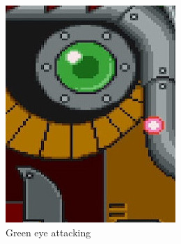 \begin{figure}[htp]
\begin{figure}[htp]
	\centering
	\begin{subfigure}[t]{0.30\linewidth}
		\centering
		\includegraphics[width=\linewidth]{figures/X1/Sigma_stages/Rangda_green.jpg}
		\caption{Green eye attacking}
	\end{subfigure}
	\begin{subfigure}[t]{0.30\linewidth}
		\centering

\end{subfigure}
\end{figure}
\end{figure}
